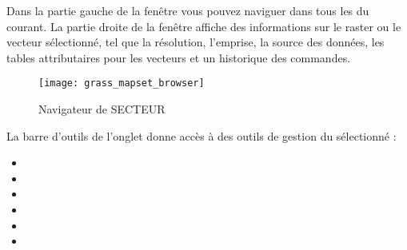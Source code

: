 {%
Dans la partie gauche de la fenêtre vous pouvez naviguer dans tous les  du  courant. La partie droite de la fenêtre affiche des informations sur le raster ou le vecteur sélectionné, tel que la résolution, l'emprise, la source des données, les tables attributaires pour les vecteurs et un historique des commandes.

\begin{figure}[ht]
 \begin{center}
 
 \texttt{[image: grass\_mapset\_browser]}
 \caption{Navigateur de SECTEUR \grass \nixcaption}\label{fig:grass_mapset_browser}
 \end{center}
\end{figure}

La barre d'outils de l'onglet  donne accès à des outils de gestion du  sélectionné :

\begin{itemize}[label=--]
\item {}
\item {}
\item {}
\item {}
\item {}
\item {}
\end{itemize}

}
